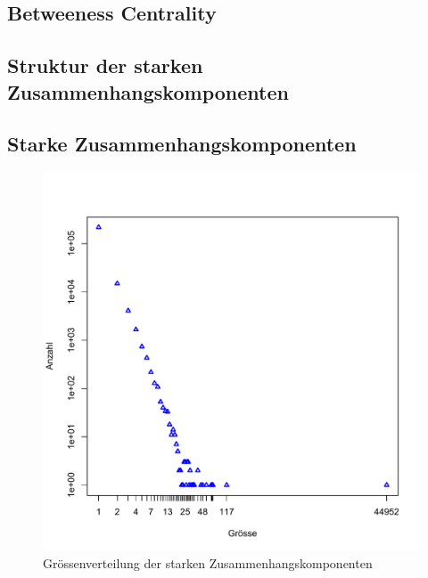 \subsection{Betweeness Centrality}
\label{sec:betw-centr}

\subsection{Struktur der starken Zusammenhangskomponenten}
\label{sec:struktur-der-starken}

\subsection{Starke Zusammenhangskomponenten}
\label{sec:result-komponentenstruktur}

\begin{figure}[t]
  \centering
  \includegraphics[scale=0.42]{images/component-size.pdf}
  \caption{Gr\"ossenverteilung der starken Zusammenhangskomponenten}
  \label{fig:component-size}
\end{figure}


